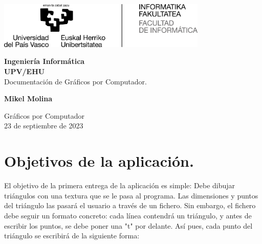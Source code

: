 \documentclass[12pt,a4paper]{article}
\begin{document}
\renewcommand*\contentsname{Índice}
\begin{titlepage}
	\begin{center}
	\vspace*{-4cm}	
       \begin{minipage}{\textwidth}
	   \centering
	   \includegraphics[width=100mm]{ehu.jpg}
	   \vspace*{4cm}
       \end{minipage}
       \vspace*{0.5cm}

	

       \textbf{Ingeniería Informática}\\
       \textbf{UPV/EHU}\\

       \vspace{0.5cm}
        Documentación de Gráficos por Computador.
            
       \vspace{1.5cm}

       \textbf{Mikel Molina}

       \vfill 
            
       
            
       \vspace{0.8cm}
     
            
       Gráficos por Computador\\
       23 de septiembre de 2023 
   \end{center}
            
\end{titlepage}
\tableofcontents
\clearpage
\section{Objetivos de la aplicación.}
El objetivo de la primera entrega de la aplicación es simple: Debe dibujar triángulos con una textura que se le pasa al programa. Las dimensiones y puntos del triángulo las pasará el usuario a través de un fichero. Sin embargo, el fichero debe seguir un formato concreto: cada línea contendrá un triángulo, y antes de escribir los puntos, se debe poner una "t" por delante. Así pues, cada punto del triángulo se escribirá de la siguiente forma:
\end{document}
